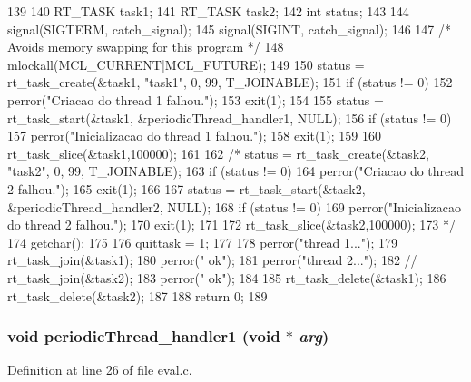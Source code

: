 \begin{DoxyCode}
139 {
140         RT_TASK task1;
141         RT_TASK task2;
142         int status;
143                 
144         signal(SIGTERM, catch_signal);
145         signal(SIGINT, catch_signal);
146 
147         /* Avoids memory swapping for this program */
148         mlockall(MCL_CURRENT|MCL_FUTURE);
149         
150         status = rt_task_create(&task1, "task1", 0, 99, T_JOINABLE);
151         if (status != 0) {
152                 perror("Criacao do thread 1 falhou.\n");
153                 exit(1);
154         }
155         status = rt_task_start(&task1, &periodicThread_handler1, NULL);
156         if (status != 0) {
157                 perror("Inicializacao do thread 1 falhou.\n");
158                 exit(1);
159         }
160         rt_task_slice(&task1,100000);
161 
162 /*      status = rt_task_create(&task2, "task2", 0, 99, T_JOINABLE);
163         if (status != 0) {
164                 perror("Criacao do thread 2 falhou.\n");
165                 exit(1);
166         }
167         status = rt_task_start(&task2, &periodicThread_handler2, NULL);
168         if (status != 0) {
169                 perror("Inicializacao do thread 2 falhou.\n");
170                 exit(1);
171         }
172         rt_task_slice(&task2,100000);
173 */      
174         getchar();
175 
176         quittask = 1;
177 
178         perror("\nEncerrando thread 1...");
179         rt_task_join(&task1); 
180         perror(" ok\n");
181         perror("\nEncerrando thread 2...");
182 //      rt_task_join(&task2); 
183         perror(" ok\n");
184         
185         rt_task_delete(&task1);
186         rt_task_delete(&task2);
187         
188         return 0;
189 }
\end{DoxyCode}
\subsubsection[{periodicThread\_\-handler1}]{\setlength{\rightskip}{0pt plus 5cm}void periodicThread\_\-handler1 (void $\ast$ {\em arg})}\label{eval_8c_afcb7264585f095779de891787c516efc}


Definition at line 26 of file eval.c.


